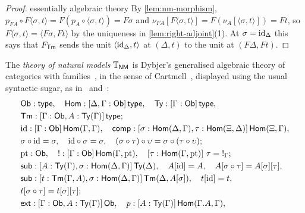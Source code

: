 \begin{proof}essentially algebraic theory
    By \cref{lem:nm-morphism}, $p_{FA} \circ F\langle \sigma, t \rangle = F(p_A \circ \langle \sigma, t \rangle) = F\sigma$ and $\nu_{FA}[F\langle \sigma, t \rangle] = F(\nu_A[\langle \sigma, t \rangle]) = Ft$, so $F\langle \sigma, t \rangle = \langle F\sigma, Ft \rangle$ by the uniqueness in \cref{lem:right-adjoint}(1). At $\sigma = \mathrm{id}_\Delta$ this says that $F_{\mathsf{Tm}}$ sends the unit $\langle \mathrm{id}_\Delta, t \rangle$ at $(\Delta, t)$ to the unit at $(F\Delta, Ft)$.
\end{proof}

\begin{definition}\label{def:tnm}
    The \emph{theory of natural models} $\mathbb{T}_{\mathsf{NM}}$ is Dybjer's generalised algebraic theory of categories with families~\cite[\S2.2]{Dybjer1996}, in the sense of Cartmell~\cite{Cartmell1986}, displayed using the usual syntactic sugar, as in~\cite[Rem.~2]{CastellanClairambaultDybjer2021} and~\cite[Defs.~12 and~13]{KaposiXie2024}:
    \begin{align*}
        &\mathsf{Ob} : \mathsf{type}, \quad \mathsf{Hom} : [\Delta, \Gamma : \mathsf{Ob}]\,\mathsf{type}, \quad \Ty : [\Gamma : \mathsf{Ob}]\,\mathsf{type},\\
        &\Tm : [\Gamma : \mathsf{Ob}, A : \Ty(\Gamma)]\,\mathsf{type};\\
        &\id : [\Gamma : \mathsf{Ob}]\,\mathsf{Hom}(\Gamma, \Gamma), \quad \mathsf{comp} : [\sigma : \mathsf{Hom}(\Delta, \Gamma), \tau : \mathsf{Hom}(\Xi, \Delta)]\,\mathsf{Hom}(\Xi, \Gamma),\\
        &\sigma \circ \id = \sigma, \quad \id \circ \sigma = \sigma, \quad (\sigma \circ \tau) \circ \upsilon = \sigma \circ (\tau \circ \upsilon);\\
        &\pt : \mathsf{Ob}, \quad {!} : [\Gamma : \mathsf{Ob}]\,\mathsf{Hom}(\Gamma, \pt), \quad [\tau : \mathsf{Hom}(\Gamma, \pt)]\ \tau = {!}_\Gamma;\\
        &\mathsf{sub} : [A : \Ty(\Gamma), \sigma : \mathsf{Hom}(\Delta, \Gamma)]\,\Ty(\Delta), \quad A[\id] = A, \quad A[\sigma \circ \tau] = A[\sigma][\tau],\\
        &\mathsf{sub} : [t : \Tm(\Gamma, A), \sigma : \mathsf{Hom}(\Delta, \Gamma)]\,\Tm(\Delta, A[\sigma]), \quad t[\id] = t,\\
        &t[\sigma \circ \tau] = t[\sigma][\tau];\\
        &\mathsf{ext} : [\Gamma : \mathsf{Ob}, A : \Ty(\Gamma)]\,\mathsf{Ob}, \quad p : [A : \Ty(\Gamma)]\,\mathsf{Hom}(\Gamma.A, \Gamma),\\

\end{align*}
\end{definition}
